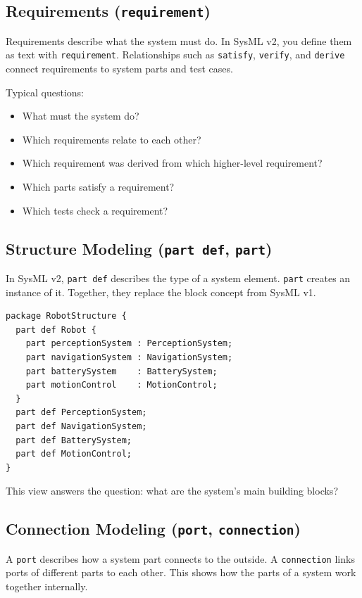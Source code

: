 \subsection{Requirements (\texttt{requirement})}
Requirements describe what the system must do. In SysML v2, you define them as text with \texttt{requirement}. Relationships such as \texttt{satisfy}, \texttt{verify}, and \texttt{derive} connect requirements to system parts and test cases.

Typical questions:

\begin{itemize}
    \item What must the system do?
    \item Which requirements relate to each other?
    \item Which requirement was derived from which higher-level requirement?
    \item Which parts satisfy a requirement?
    \item Which tests check a requirement?
\end{itemize}

\subsection{Structure Modeling (\texttt{part def}, \texttt{part})}
In SysML v2, \texttt{part def} describes the type of a system element. \texttt{part} creates an instance of it. Together, they replace the block concept from SysML v1.

\begin{lstlisting}
package RobotStructure {
  part def Robot {
    part perceptionSystem : PerceptionSystem;
    part navigationSystem : NavigationSystem;
    part batterySystem    : BatterySystem;
    part motionControl    : MotionControl;
  }
  part def PerceptionSystem;
  part def NavigationSystem;
  part def BatterySystem;
  part def MotionControl;
}
\end{lstlisting}

This view answers the question: what are the system's main building blocks?

\subsection{Connection Modeling (\texttt{port}, \texttt{connection})}
A \texttt{port} describes how a system part connects to the outside. A \texttt{connection} links ports of different parts to each other. This shows how the parts of a system work together internally.

